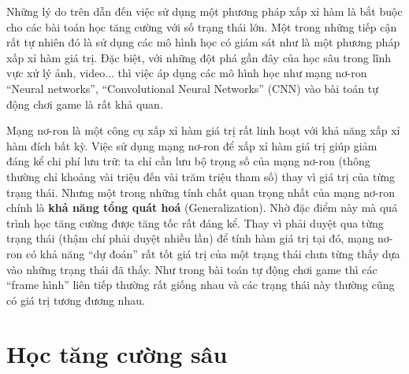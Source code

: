 	Những lý do trên dẫn đến việc sử dụng một phương pháp xấp xỉ hàm là bắt buộc cho các bài toán học tăng cường với số trạng thái lớn.
	Một trong những tiếp cận rất tự nhiên đó là sử dụng các mô hình học có giám sát như là một phương pháp xấp xỉ hàm giá trị.
	Đặc biệt, với những đột phá gần đây của học sâu trong lĩnh vực xử lý ảnh, video... thì việc áp dụng các mô hình học như mạng nơ-ron ``Neural networks'', ``Convolutional Neural Networks'' (CNN) vào bài toán tự động chơi game là rất khả quan.
	
	Mạng nơ-ron là một công cụ xấp xỉ hàm giá trị rất linh hoạt với khả năng xấp xỉ hàm đích bất kỳ.
	Việc sử dụng mạng nơ-ron để xấp xỉ hàm giá trị giúp giảm đáng kể chi phí lưu trữ: ta chỉ cần lưu bộ trọng số của mạng nơ-ron (thông thường chỉ khoảng vài triệu đến vài trăm triệu tham số) thay vì giá trị của từng trạng thái.
	Nhưng một trong những tính chất quan trọng nhất của mạng nơ-ron chính là \textbf{khả năng tổng quát hoá} (Generalization).
	Nhờ đặc điểm này mà quá trình học tăng cường được tăng tốc rất đáng kể.
	Thay vì phải duyệt qua từng trạng thái (thậm chí phải duyệt nhiều lần) để tính hàm giá trị tại đó, mạng nơ-ron có khả năng ``dự đoán'' rất tốt giá trị của một trạng thái chưa từng thấy dựa vào những trạng thái đã thấy.
	Như trong bài toán tự động chơi game thì các ``frame hình'' liên tiếp thường rất giống nhau và các trạng thái này thường cũng có giá trị tương đương nhau.
	 
	
\section{Học tăng cường sâu}
%	
	
